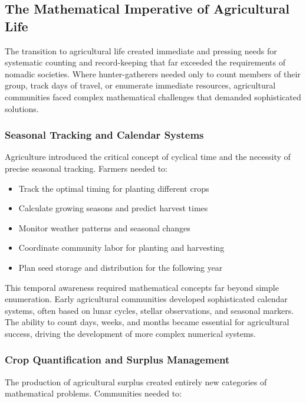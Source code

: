 \documentclass[12pt, oneside, openany]{book}
\begin{document}
\subsection{The Mathematical Imperative of Agricultural Life}

The transition to agricultural life created immediate and pressing needs for systematic counting and record-keeping that far exceeded the requirements of nomadic societies. Where hunter-gatherers needed only to count members of their group, track days of travel, or enumerate immediate resources, agricultural communities faced complex mathematical challenges that demanded sophisticated solutions.

\subsubsection{Seasonal Tracking and Calendar Systems}

Agriculture introduced the critical concept of cyclical time and the necessity of precise seasonal tracking. Farmers needed to:

\begin{itemize}
	\item Track the optimal timing for planting different crops
	\item Calculate growing seasons and predict harvest times
	\item Monitor weather patterns and seasonal changes
	\item Coordinate community labor for planting and harvesting
	\item Plan seed storage and distribution for the following year
\end{itemize}

This temporal awareness required mathematical concepts far beyond simple enumeration. Early agricultural communities developed sophisticated calendar systems, often based on lunar cycles, stellar observations, and seasonal markers. The ability to count days, weeks, and months became essential for agricultural success, driving the development of more complex numerical systems.

\subsubsection{Crop Quantification and Surplus Management}

The production of agricultural surplus created entirely new categories of mathematical problems. Communities needed to:
\end{document}
